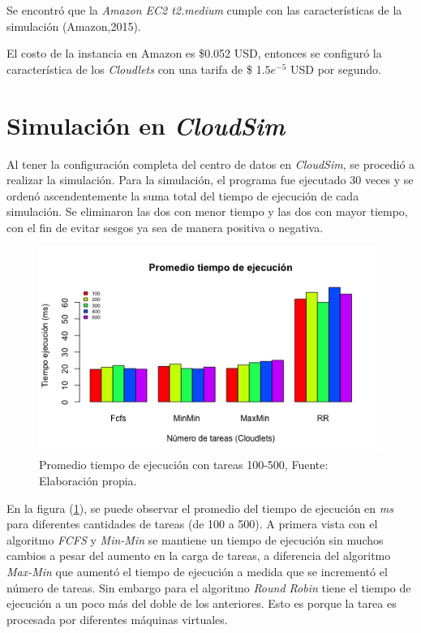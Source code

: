 Se encontró que la \textit{Amazon EC2 t2.medium} cumple con las características de la simulación (Amazon,2015).

El costo de la instancia en Amazon es \$0.052 USD, entonces se configuró la característica  de los \textit{Cloudlets} con una tarifa de \$ 1.$5 e^{-5}$ USD por segundo.

 




\newpage
\section{Simulación en \textit{CloudSim}}

Al tener la configuración completa del centro de datos en \textit{CloudSim}, se procedió a realizar la simulación.
Para la simulación, el programa fue ejecutado 30 veces y se ordenó ascendentemente la suma total del tiempo de ejecución de cada simulación. Se eliminaron las dos con menor tiempo y las dos con mayor tiempo, con el fin de evitar sesgos ya sea de manera positiva o negativa.

\setcounter{figure}{24}
\renewcommand\thefigure{\arabic{figure}}
\begin{figure}[h!] 
	\centering
	\includegraphics[scale=0.6]{media/tiempoejecucionjpg}
	\caption{Promedio tiempo de ejecuci\'on con tareas 100-500, Fuente: Elaboraci\'on propia.}
	\label{fig:tiempo}
\end{figure}



En la figura (\ref{fig:tiempo}), se puede observar el promedio del tiempo de ejecuci\'on en \emph{ms} para diferentes cantidades de tareas (de 100 a 500). A primera vista con el algoritmo \textit{FCFS} y \textit{Min-Min} se mantiene un tiempo de ejecuci\'on sin muchos cambios a pesar del aumento en la carga de tareas, a diferencia del algoritmo \textit{Max-Min} que aument\'o el tiempo de ejecuci\'on a medida que se increment\'o el n\'umero de tareas. Sin embargo para el algoritmo \textit{Round Robin} tiene el tiempo de ejecución a un poco más del doble de los anteriores. Esto es porque la tarea es procesada por diferentes máquinas virtuales.

